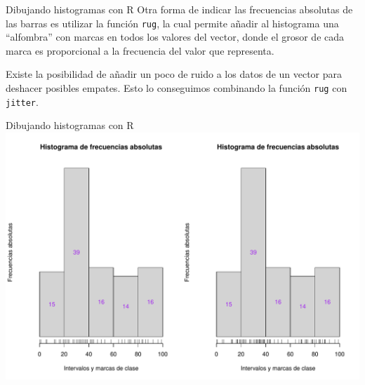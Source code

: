 \documentclass[
  ignorenonframetext,
]{beamer}
\begin{document}
\begin{frame}[fragile]{Dibujando histogramas con R}
\label{dibujando-histogramas-con-r-5}
Otra forma de indicar las frecuencias absolutas de las barras es
utilizar la función \texttt{rug}, la cual permite añadir al histograma
una ``alfombra'' con marcas en todos los valores del vector, donde el
grosor de cada marca es proporcional a la frecuencia del valor que
representa.

Existe la posibilidad de añadir un poco de ruido a los datos de un
vector para deshacer posibles empates. Esto lo conseguimos combinando la
función \texttt{rug} con \texttt{jitter}.
\end{frame}

\begin{frame}{Dibujando histogramas con R}
\label{dibujando-histogramas-con-r-6}
\includegraphics{R_base_files/figure-beamer/unnamed-chunk-237-1.pdf}
\end{frame}
\end{document}
